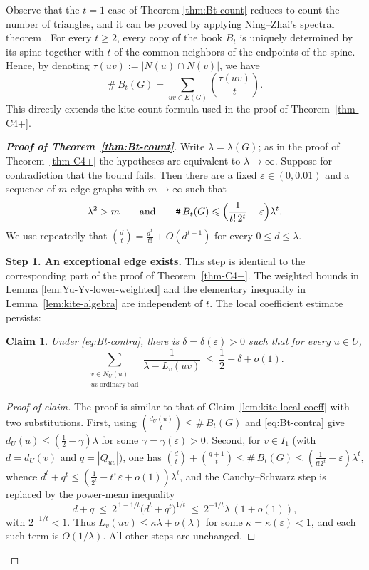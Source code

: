 \documentclass[11pt,a4paper]{article}
\newtheorem{claim}[theorem]{Claim}
\theoremstyle{definition}
\theoremstyle{plain}
\renewcommand{\le}{\leqslant}
\renewcommand{\ge}{\geqslant}
\begin{document}
Observe that the $t=1$ case of Theorem \ref{thm:Bt-count} reduces to count the number of triangles, and it can be proved by applying  Ning--Zhai's spectral theorem \cite{NingZhai2023}. 
 For every $t\ge2$, 
 every copy of the book $B_t$ is uniquely determined by its spine
together with $t$ of the common neighbors of the endpoints of the spine. Hence, by denoting $\tau(uv):=|N(u)\cap N(v)|$, we have 
\begin{equation}\label{eq:book-count-t}
   \texttt{\#}\,B_t(G)=\sum_{uv\in E(G)}\binom{\tau(uv)}{t}.
\end{equation}
This directly extends the kite-count formula used in the proof of Theorem~\ref{thm-C4+}. 



\begin{proof}[{\bf Proof of Theorem~\ref{thm:Bt-count}}]
Write $\lambda=\lambda(G)$; as in the proof of Theorem~\ref{thm-C4+} the
hypotheses are equivalent to $\lambda\to\infty$.  Suppose for contradiction that
the bound fails.  Then there are a fixed $\varepsilon\in(0,0.01)$
and a sequence of $m$-edge graphs with $m\to\infty$ such that
\begin{equation}\label{eq:Bt-contra}
   \lambda^2>m
   \qquad\text{and}\qquad
   \texttt{\#}\,B_t(G)\le\Bigl(\frac{1}{t!\,2^{t}}-\varepsilon\Bigr)\lambda^{t}. 
\end{equation}
 We use repeatedly that
$\binom{d}{t}=\tfrac{d^t}{t!}+O(d^{t-1})$ for every $0\le d\le\lambda$.

\medskip
\noindent\textbf{Step 1. An exceptional edge exists.}
This step is identical to the corresponding part of the proof of
Theorem~\ref{thm-C4+}.  The weighted bounds
in Lemma \ref{lem:Yu-Yv-lower-weighted} and the elementary inequality in Lemma~\ref{lem:kite-algebra} are
independent of $t$.  The local coefficient estimate persists:

\begin{claim}\label{cl:Bt-coeff}
Under \eqref{eq:Bt-contra}, there is $\delta=\delta(\varepsilon)>0$ such that 
for every $u\in U$,
\[
   \sum_{\substack{v\in N_U(u)\\ uv\ \mathrm{ordinary\ bad}}}
   \frac{1}{\lambda-L_v(uv)}\ \le\ \frac12-\delta+o(1).
\]
\end{claim}

\begin{proof}[Proof of claim]
The proof is similar to that of Claim~\ref{lem:kite-local-coeff} with two
substitutions.  First, using $\binom{d_U(u)}{t}\le\texttt{\#}\,B_t(G)$ and
\eqref{eq:Bt-contra} give $d_U(u)\le(\tfrac12-\gamma)\lambda$ for some
$\gamma=\gamma(\varepsilon)>0$.  Second, for $v\in I_1$ (with $d=d_U(v)$ and 
$q=|Q_{uv}|$), one has $\binom{d}{t}+\binom{q+1}{t}\le\texttt{\#}\,B_t(G)
\le(\tfrac1{t!2^t}-\varepsilon)\lambda^t$, whence
$d^t+q^t\le(\tfrac1{2^t}-t!\,\varepsilon+o(1))\lambda^t$, and the
Cauchy--Schwarz step is replaced by the power-mean inequality
\[
   d+q\ \le\ 2^{\,1-1/t}\bigl(d^t+q^t\bigr)^{1/t}\ \le\ 2^{-1/t}\lambda\,(1+o(1)),
\]
with $2^{-1/t}<1$.  Thus $L_v(uv)\le\kappa\lambda+o(\lambda)$ for some
$\kappa=\kappa(\varepsilon)<1$, and each such term is $O(1/\lambda)$.  All other
steps are unchanged.
\end{proof}


\end{proof}
\end{document}
